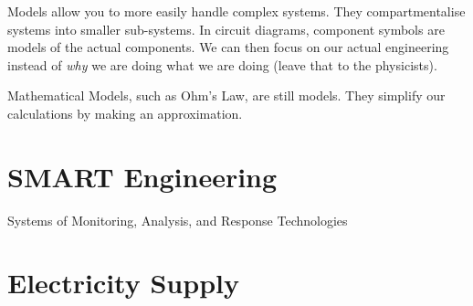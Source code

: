 \documentclass[12pt]{article}
\begin{document}
\vspace{3pt}
Models allow you to more easily handle complex systems.
They compartmentalise systems into smaller sub-systems.
In circuit diagrams, component symbols are models of the actual components.
We can then focus on our actual engineering instead of {\it why} we are doing what we are doing (leave that to the physicists).

Mathematical Models, such as Ohm's Law, are still models. 
They simplify our calculations by making an approximation.

\section{SMART Engineering}
\begin{definition*}
  Systems of Monitoring, Analysis, and Response Technologies
\end{definition*}

\section{Electricity Supply}
\end{document}
